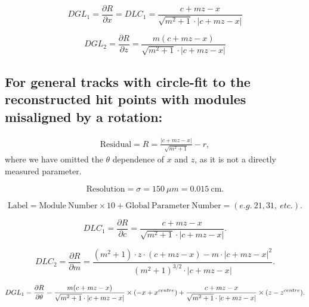 \documentclass[a4paper,11pt]{article}
\begin{document}
\begin{equation}	
DGL_1 = \frac{\partial R}{\partial x} = DLC_1 = \frac{ c+mz-x }  { \sqrt{m^2+1} \cdot |c+mz-x| }
\end{equation}

\begin{equation}	
DGL_2 = \frac{\partial R}{\partial z} = \frac{ m(c+mz-x) }  { \sqrt{m^2+1} \cdot |c+mz-x| }
\end{equation}


\clearpage

\subsection{For general tracks with circle-fit to the reconstructed hit points with modules misaligned by a rotation:}
\begin{equation}
\begin{split}
\mathrm{Residual} = R =\frac{ |c+mz-x| }  { \sqrt{m^2+1} } -r,
\end{split}
\end{equation}
where we have omitted the $\theta$ dependence of $x$ and $z$, as it is not a directly measured parameter.

\begin{equation}	
\mathrm{Resolution} = \sigma = 150 \ \mu m = 0.015 \ \mathrm{cm}.
\end{equation}

\begin{equation}	
\mathrm{Label}= \mathrm{Module \ Number} \times 10 + \mathrm{Global \ Parameter \ Number} = (e.g. \ 21, 31, \ etc.).
\end{equation}

\begin{equation}
DLC_1 = \frac{\partial R}{\partial c} = \frac{ c+mz-x }  { \sqrt{m^2+1} \cdot |c+mz-x| }.
\end{equation}

\begin{equation}
DLC_2 = \frac{ \partial R}{\partial m} = \frac{ (m^2+1)\cdot z\cdot(c+mz-x) - m\cdot |c+mz-x|^2 }{ (m^2+1)^{3/2} \cdot |c+mz-x|  }.
\end{equation}

\begin{equation}	
DGL_1 = \frac{\partial R}{\partial\theta} = 
\frac{ m(c+mz-x) }  { \sqrt{m^2+1} \cdot |c+mz-x| } \times (-x + x^{centre}) + \\ \frac{ c+mz-x }  { \sqrt{m^2+1} \cdot |c+mz-x| } \times (z - z^{centre}).
\end{equation}
\end{document}

